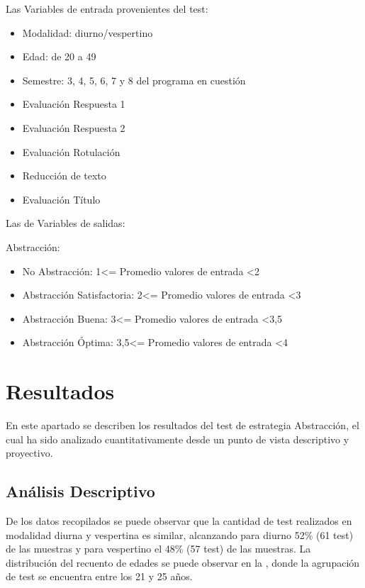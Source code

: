 \documentclass{textolivre}
\begin{document}
Las Variables de entrada provenientes del test:

\begin{itemize}
\item Modalidad: diurno/vespertino
\item Edad: de 20 a 49
\item Semestre: 3, 4, 5, 6, 7 y 8 del programa en cuestión
\item Evaluación Respuesta 1  
\item Evaluación Respuesta 2
\item Evaluación Rotulación
\item Reducción de texto
\item Evaluación Título
\end{itemize}

Las de Variables de salidas:

Abstracción:

\begin{itemize}
\item No Abstracción: 1<= Promedio valores de entrada <2
\item Abstracción Satisfactoria: 2<= Promedio valores de entrada <3
\item Abstracción Buena: 3<= Promedio valores de entrada <3,5
\item Abstracción Óptima: 3,5<= Promedio valores de entrada <4
\end{itemize}


\section{Resultados}\label{result}
En este apartado se describen los resultados del test de estrategia Abstracción, el cual  ha sido analizado cuantitativamente desde un punto de vista descriptivo y proyectivo.

\subsection{Análisis Descriptivo}
De los datos recopilados se puede observar que la cantidad de test realizados en modalidad diurna y vespertina es similar, alcanzando para diurno 52\% (61 test) de las muestras y para vespertino el 48\% (57 test) de las muestras. La distribución del recuento de edades se puede observar en la , donde la agrupación de test se encuentra entre los 21 y 25 años.
\end{document}
